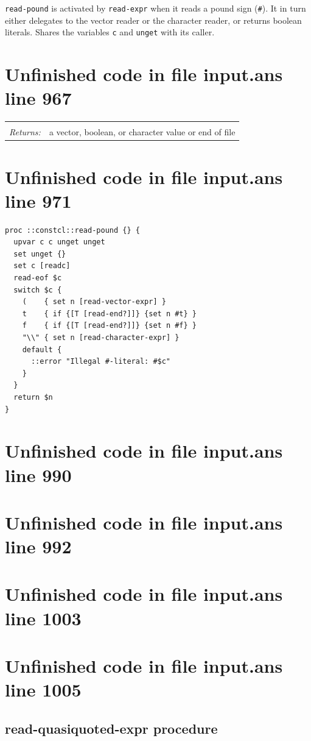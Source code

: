 \documentclass[twoside,9pt]{report}
\begin{document}
\texttt{read-pound} is activated by \texttt{read-expr} when it reads a pound sign (\texttt{\#}). It in turn either delegates to the vector reader or the character reader, or returns boolean literals. Shares the variables \texttt{c} and \texttt{unget} with its caller.

\section{Unfinished code in file input.ans line 967}
\noindent\begin{tabular}{ |p{1.9cm} p{8cm}| }
\hline
\rowcolor[HTML]{CCCCCC} \multicolumn{2}{|l|}{\bf read-pound (internal)} \\
\textit{Returns:} & a vector, boolean, or character value or end of file \\
\hline
\end{tabular}
\section{Unfinished code in file input.ans line 971}
\begin{lstlisting}
proc ::constcl::read-pound {} {
  upvar c c unget unget
  set unget {}
  set c [readc]
  read-eof $c
  switch $c {
    (    { set n [read-vector-expr] }
    t    { if {[T [read-end?]]} {set n #t} }
    f    { if {[T [read-end?]]} {set n #f} }
    "\\" { set n [read-character-expr] }
    default {
      ::error "Illegal #-literal: #$c"
    }
  }
  return $n
}
\end{lstlisting}
\section{Unfinished code in file input.ans line 990}
\section{Unfinished code in file input.ans line 992}
\section{Unfinished code in file input.ans line 1003}
\section{Unfinished code in file input.ans line 1005}
\subsection{read-quasiquoted-expr procedure}
\label{read-quasiquoted-expr-procedure}
\end{document}
